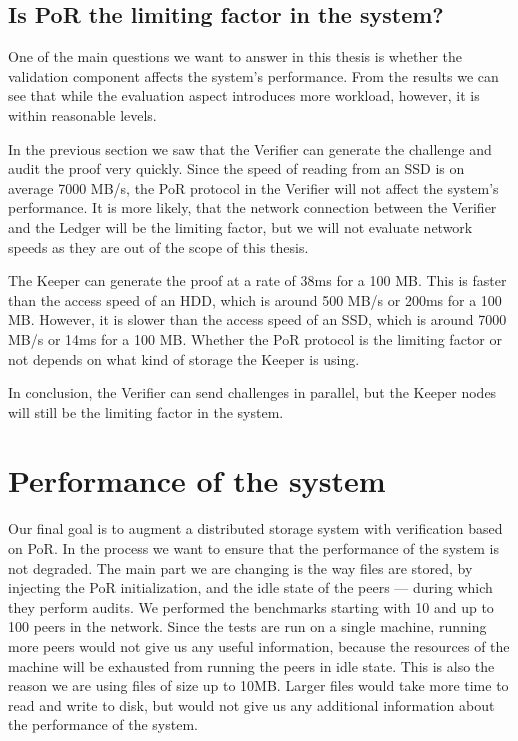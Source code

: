 \subsection{Is PoR the limiting factor in the system?}

One of the main questions we want to answer in this thesis is whether the validation component
affects the system's performance.
From the results we can see that while the evaluation aspect introduces more workload,
however, it is within reasonable levels.

In the previous section we saw that the Verifier can generate the challenge and audit the proof very quickly.
Since the speed of reading from an SSD is on average 7000 MB/s, the PoR protocol in the Verifier
will not affect the system's performance.
It is more likely, that the network connection between the Verifier and the Ledger will be the limiting factor,
but we will not evaluate network speeds as they are out of the scope of this thesis.

The Keeper can generate the proof at a rate of 38ms for a 100 MB.
This is faster than the access speed of an HDD, which is around 500 MB/s or 200ms for a 100 MB.
However, it is slower than the access speed of an SSD, which is around 7000 MB/s or 14ms for a 100 MB.
Whether the PoR protocol is the limiting factor or not depends on what kind of storage the Keeper is using.

In conclusion, the Verifier can send challenges in parallel, but the Keeper nodes will still be
the limiting factor in the system.

\section{Performance of the system}

Our final goal is to augment a distributed storage system with verification based on PoR.
In the process we want to ensure that the performance of the system is not degraded.
The main part we are changing is the way files are stored, by injecting the PoR initialization,
and the idle state of the peers --- during which they perform audits.
We performed the benchmarks starting with 10 and up to 100 peers in the network.
Since the tests are run on a single machine, running more peers would not give us any useful information,
because the resources of the machine will be exhausted from running the peers in idle state.
This is also the reason we are using files of size up to 10MB.
Larger files would take more time to read and write to disk,
but would not give us any additional information about the performance of the system.

